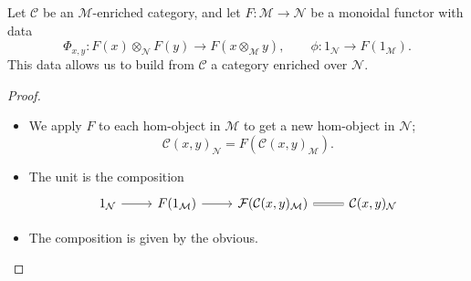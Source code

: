 \documentclass[notes.tex]{subfiles}
\begin{document}
\begin{lemma}
  \label{lemma:monoidal_functor_switches_enrichment}
  Let $\mathcal{C}$ be an $\mathcal{M}$-enriched category, and let $F\colon \mathcal{M} \to \mathcal{N}$ be a monoidal functor with data
  \begin{equation*}
    \Phi_{x, y}\colon F(x) \otimes_{\mathcal{N}} F(y) \to F(x \otimes_{\mathcal{M}} y),\qquad \phi\colon 1_{\mathcal{N}} \to F(1_{\mathcal{M}}).
  \end{equation*}
  This data allows us to build from $\mathcal{C}$ a category enriched over $\mathcal{N}$.
\end{lemma}
\begin{proof}
  \leavevmode
  \begin{itemize}
    \item We apply $F$ to each hom-object in $\mathcal{M}$ to get a new hom-object in $\mathcal{N}$;
      \begin{equation*}
        \mathcal{C}(x, y)_{\mathcal{N}} = F(\mathcal{C}(x, y)_{\mathcal{M}}).
      \end{equation*}

    \item The unit is the composition
      \begin{equation*}
        \begin{tikzcd}
          1_{\mathcal{N}}
          \arrow[r]
          & F(1_{\mathcal{M}})
          \arrow[r]
          & \mathcal{F}(\mathcal{C}(x, y)_{\mathcal{M}})
          \arrow[r, equals]
          & \mathcal{C}(x, y)_{\mathcal{N}}
        \end{tikzcd}
      \end{equation*}

    \item The composition is given by the obvious.
  \end{itemize}
\end{proof}
\end{document}
